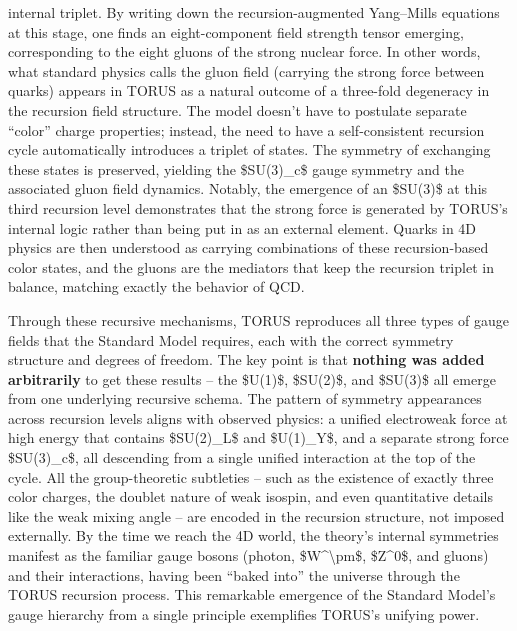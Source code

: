 \documentclass[
]{article}
\begin{document}
{\begin{itemize}
  internal triplet\hspace{0pt}. By writing down the recursion-augmented
  Yang--Mills equations at this stage, one finds an eight-component
  field strength tensor emerging, corresponding to the eight gluons of
  the strong nuclear force\hspace{0pt}. In other words, what standard
  physics calls the gluon field (carrying the strong force between
  quarks) appears in TORUS as a natural outcome of a three-fold
  degeneracy in the recursion field structure\hspace{0pt}. The model
  doesn't have to postulate separate ``color'' charge properties;
  instead, the need to have a self-consistent recursion cycle
  automatically introduces a triplet of states. The symmetry of
  exchanging these states is preserved, yielding the \$SU(3)\_c\$ gauge
  symmetry and the associated gluon field dynamics\hspace{0pt}. Notably,
  the emergence of an \$SU(3)\$ at this third recursion level
  demonstrates that the strong force is generated by TORUS's internal
  logic rather than being put in as an external element\hspace{0pt}.
  Quarks in 4D physics are then understood as carrying combinations of
  these recursion-based color states, and the gluons are the mediators
  that keep the recursion triplet in balance, matching exactly the
  behavior of QCD.
\end{itemize}

Through these recursive mechanisms, TORUS reproduces all three types of
gauge fields that the Standard Model requires, each with the correct
symmetry structure and degrees of freedom. The key point is that
\textbf{nothing was added arbitrarily} to get these results -- the
\$U(1)\$, \$SU(2)\$, and \$SU(3)\$ all emerge from one underlying
recursive schema. The pattern of symmetry appearances across recursion
levels aligns with observed physics: a unified electroweak force at high
energy that contains \$SU(2)\_L\$ and \$U(1)\_Y\$, and a separate strong
force \$SU(3)\_c\$, all descending from a single unified interaction at
the top of the cycle\hspace{0pt}. All the group-theoretic subtleties --
such as the existence of exactly three color charges, the doublet nature
of weak isospin, and even quantitative details like the weak mixing
angle -- are encoded in the recursion structure, not imposed
externally\hspace{0pt}. By the time we reach the 4D world, the theory's
internal symmetries manifest as the familiar gauge bosons (photon,
\$W\^{}\textbackslash pm\$, \$Z\^{}0\$, and gluons) and their
interactions, having been ``baked into'' the universe through the TORUS
recursion process. This remarkable emergence of the Standard Model's
gauge hierarchy from a single principle exemplifies TORUS's unifying
power.

}
\end{document}
